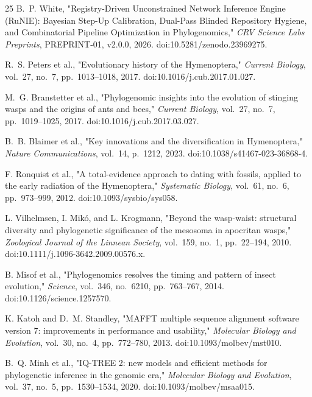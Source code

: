 \documentclass[10pt,letterpaper]{article}
\begin{document}
\begin{thebibliography}{25}
B.~P. White, "Registry-Driven Unconstrained Network Inference Engine (RuNIE): Bayesian Step-Up Calibration, Dual-Pass Blinded Repository Hygiene, and Combinatorial Pipeline Optimization in Phylogenomics," \emph{CRV Science Labs Preprints}, PREPRINT-01, v2.0.0, 2026. doi:10.5281/zenodo.23969275.

R.~S. Peters et al., "Evolutionary history of the Hymenoptera," \emph{Current Biology}, vol.~27, no.~7, pp.~1013--1018, 2017. doi:10.1016/j.cub.2017.01.027.

M.~G. Branstetter et al., "Phylogenomic insights into the evolution of stinging wasps and the origins of ants and bees," \emph{Current Biology}, vol.~27, no.~7, pp.~1019--1025, 2017. doi:10.1016/j.cub.2017.03.027.

B.~B. Blaimer et al., "Key innovations and the diversification in Hymenoptera," \emph{Nature Communications}, vol.~14, p.~1212, 2023. doi:10.1038/s41467-023-36868-4.

F. Ronquist et al., "A total-evidence approach to dating with fossils, applied to the early radiation of the Hymenoptera," \emph{Systematic Biology}, vol.~61, no.~6, pp.~973--999, 2012. doi:10.1093/sysbio/sys058.

L. Vilhelmsen, I. Mik\'o, and L. Krogmann, "Beyond the wasp-waist: structural diversity and phylogenetic significance of the mesosoma in apocritan wasps," \emph{Zoological Journal of the Linnean Society}, vol.~159, no.~1, pp.~22--194, 2010. doi:10.1111/j.1096-3642.2009.00576.x.

B. Misof et al., "Phylogenomics resolves the timing and pattern of insect evolution," \emph{Science}, vol.~346, no.~6210, pp.~763--767, 2014. doi:10.1126/science.1257570.

K. Katoh and D.~M. Standley, "MAFFT multiple sequence alignment software version 7: improvements in performance and usability," \emph{Molecular Biology and Evolution}, vol.~30, no.~4, pp.~772--780, 2013. doi:10.1093/molbev/mst010.

B.~Q. Minh et al., "IQ-TREE 2: new models and efficient methods for phylogenetic inference in the genomic era," \emph{Molecular Biology and Evolution}, vol.~37, no.~5, pp.~1530--1534, 2020. doi:10.1093/molbev/msaa015.


\end{thebibliography}
\end{document}
